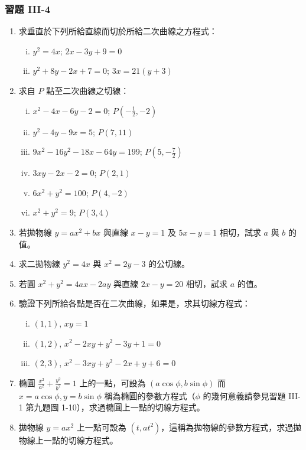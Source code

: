 \subsubsection*{習題 III-4}

\begin{enumerate}
  \item 求垂直於下列所給直線而切於所給二次曲線之方程式：
  \begin{enumerate}[(i)]
    \item $y^2 = 4x$; $2x - 3y + 9 = 0$
    \item $y^2 + 8y - 2x + 7 = 0$; $3x = 21(y + 3)$
  \end{enumerate}

  \item 求自 $P$ 點至二次曲線之切線：
  \begin{enumerate}[(i)]
    \item $x^2 - 4x - 6y - 2 = 0$; $P(-\frac{1}{2}, -2)$
    \item $y^2 - 4y - 9x = 5$; $P(7, 11)$
    \item $9x^2 - 16y^2 - 18x - 64y = 199$; $P(5, -\frac{7}{2})$
    \item $3xy - 2x - 2 = 0$; $P(2, 1)$
    \item $6x^2 + y^2 = 100$; $P(4, -2)$
    \item $x^2 + y^2 = 9$; $P(3, 4)$
  \end{enumerate}

  \item[*\theenumi.] 若拋物線 $y = ax^2 + bx$ 與直線 $x - y = 1$ 及 $5x - y = 1$ 相切，試求 $a$ 與 $b$ 的值。

  \item[*\theenumi.] 求二拋物線 $y^2 = 4x$ 與 $x^2 = 2y - 3$ 的公切線。

  \item 若圓 $x^2 + y^2 = 4ax - 2ay$ 與直線 $2x - y = 20$ 相切，試求 $a$ 的值。

  \item 驗證下列所給各點是否在二次曲線，如果是，求其切線方程式：
  \begin{enumerate}[(i)]
    \item $(1,1)$, $xy = 1$
    \item $(1,2)$, $x^2 - 2xy + y^2 - 3y + 1 = 0$
    \item $(2,3)$, $x^2 - 3xy + y^2 - 2x + y + 6 = 0$
  \end{enumerate}

  \item[*\theenumi.] 橢圓 $\frac{x^2}{a^2} + \frac{y^2}{b^2} = 1$ 上的一點，可設為 $(a\cos\phi, b\sin\phi)$ 而 $x = a\cos\phi, y = b\sin\phi$ 稱為橢圓的參數方程式（$\phi$ 的幾何意義請參見習題 III-1 第九題圖 1-10），求過橢圓上一點的切線方程式。

  \item[*\theenumi.] 拋物線 $y = ax^2$ 上一點可設為 $(t, at^2)$，這稱為拋物線的參數方程式，求過拋物線上一點的切線方程式。
\end{enumerate}

